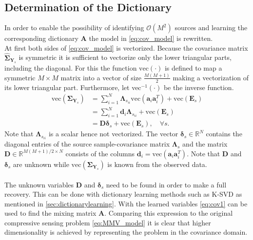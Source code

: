\subsection{Determination of the Dictionary}
In order to enable the possibility of identifying $\mathcal{O}(M^2)$ sources and learning the corresponding dictionary $\mathbf{A}$ the model in \eqref{eq:cov_model} is rewritten. 
\\ 
At first both sides of \eqref{eq:cov_model} is vectorized. Because the covariance matrix $\hat{\boldsymbol{\Sigma}}_{\mathbf{Y}_s}$ is symmetric it is sufficient to vectorize only the lower triangular parts, including the diagonal. For this the function $\text{vec}(\cdot)$ is defined to map a symmetric $M \times M$ matrix into a vector of size $\frac{M(M+1)}{2}$ making a vectorization of its lower triangular part. Furthermore, let vec$^{-1}(\cdot)$ be the inverse function.      
\begin{align}\label{eq:cov1}
\text{vec}(\boldsymbol{\Sigma}_{\mathbf{Y}_s}) &= \sum_{i=1}^N \boldsymbol{\Lambda}_{s_{ii}} \text{vec}(\mathbf{a}_i \mathbf{a}_i^T) + \text{vec}(\mathbf{E}_s) \nonumber \\
&= \sum_{i=1}^N \mathbf{d}_i \boldsymbol{\Lambda}_{s_{ii}} + \text{vec}(\mathbf{E}_s) \nonumber \\
&= \mathbf{D} \boldsymbol{\delta}_s + \text{vec}(\mathbf{E}_s), \quad \forall s.
\end{align}
Note that $\boldsymbol{\Lambda}_{s_{ii}}$ is a scalar hence not vectorized. The vector $\boldsymbol{\delta}_s \in \mathbb{R}^{N}$ contains the diagonal entries of the source sample-covariance matrix $\boldsymbol{\Lambda}_s$
and the matrix $\mathbf{D} \in \mathbb{R}^{M(M+1)/2 \times N}$ consists of the columns $\mathbf{d}_i = \text{vec}(\mathbf{a}_i \mathbf{a}_i^T)$. Note that $\mathbf{D}$ and $\boldsymbol{\delta}_s$ are unknown while $\text{vec}(\boldsymbol{\Sigma}_{\mathbf{Y}_s})$ is known from the observed data.
\\ \\
The unknown variables $\mathbf{D}$ and $\boldsymbol{\delta}_s$ need to be found in order to make a full recovery. This can be done with dictionary learning methods such as K-SVD as mentioned in \ref{sec:dictionarylearning}. With the learned variables \eqref{eq:cov1} can be used to find the mixing matrix $\mathbf{A}$. Comparing this expression to the original compressive sensing problem \eqref{eq:MMV_model} it is clear that higher dimensionality is achieved by representing the problem in the covariance domain. 
